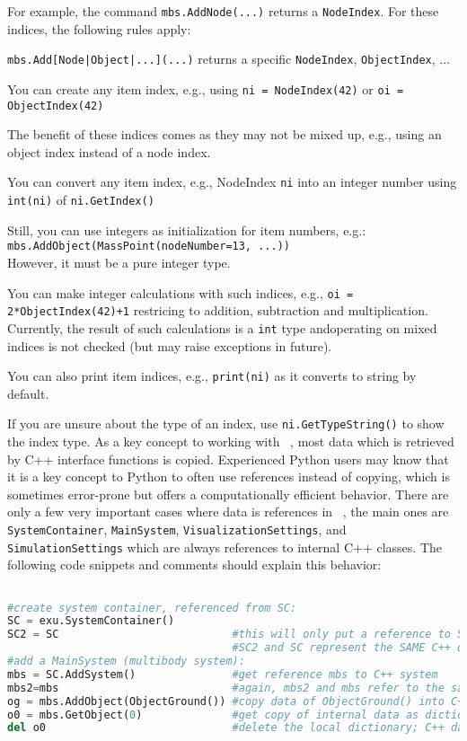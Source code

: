 For example, the command \texttt{mbs.AddNode(...)} returns a \texttt{NodeIndex}. For these indices, the following rules apply:
\bi
  \item[] \texttt{mbs.Add[Node|Object|...](...)} returns a specific \texttt{NodeIndex}, \texttt{ObjectIndex}, ...
  \item[] You can create any item index, e.g., using \texttt{ni = NodeIndex(42)} or \texttt{oi = ObjectIndex(42)}
  \item[] The benefit of these indices comes as they may not be mixed up, e.g., using an object index instead of a node index.
  \item[] You can convert any item index, e.g., NodeIndex \texttt{ni} into an integer number using \texttt{int(ni)} of \texttt{ni.GetIndex()}
  \item[] Still, you can use integers as initialization for item numbers, e.g.:\\\texttt{mbs.AddObject(MassPoint(nodeNumber=13, ...))}\\However, it must be a pure integer type.
  \item[] You can make integer calculations with such indices, e.g., \texttt{oi = 2*ObjectIndex(42)+1} restricing to addition, subtraction and multiplication. Currently, the result of such calculations is a \texttt{int} type andoperating on mixed indices is not checked (but may raise exceptions in future).
  \item[] You can also print item indices, e.g., \texttt{print(ni)} as it converts to string by default.
  \item[] If you are unsure about the type of an index, use \texttt{ni.GetTypeString()} to show the index type.
\ei
{}
\label{sec:generalPythonInterface:copyref}
As a key concept to working with \codeName\ , most data which is retrieved by C++ interface functions is copied.
Experienced Python users may know that it is a key concept to Python to often use references instead of copying, which is
sometimes error-prone but offers a computationally efficient behavior.
There are only a few very important cases where data is references in \codeName\ , the main ones are 
\texttt{SystemContainer}, 
\texttt{MainSystem}, 
\texttt{VisualizationSettings}, and
\texttt{SimulationSettings} which are always references to internal C++ classes.
The following code snippets and comments should explain this behavior:
\pythonstyle
\begin{lstlisting}[language=Python, firstnumber=1]

#create system container, referenced from SC:
SC = exu.SystemContainer()
SC2 = SC                           #this will only put a reference to SC
                                   #SC2 and SC represent the SAME C++ object
#add a MainSystem (multibody system):
mbs = SC.AddSystem()               #get reference mbs to C++ system
mbs2=mbs                           #again, mbs2 and mbs refer to the same C++ object
og = mbs.AddObject(ObjectGround()) #copy data of ObjectGround() into C++
o0 = mbs.GetObject(0)              #get copy of internal data as dictionary
del o0                             #delete the local dictionary; C++ data not affected
\end{lstlisting}


